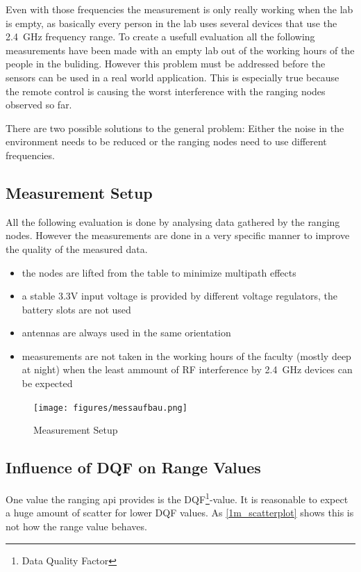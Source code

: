 Even with those frequencies the measurement is only really working when the lab is empty, as basically every person in the lab uses several devices that use the \SI{2.4}{GHz} frequency range.
To create a usefull evaluation all the following measurements have been made with an empty lab out of the working hours of the people in the buliding.
However this problem must be addressed before the sensors can be used in a real world application.
This is especially true because the remote control is causing the worst interference with the ranging nodes observed so far.

There are two possible solutions to the general problem: Either the noise in the environment needs to be reduced or the ranging nodes need to use different frequencies.


\subsection{Measurement Setup}

All the following evaluation is done by analysing data gathered by the ranging nodes.
However the measurements are done in a very specific manner to improve the quality of the measured data.
\begin{itemize}
	\item the nodes are lifted from the table to minimize multipath effects
	\item a stable 3.3V input voltage is provided by different voltage regulators, the battery slots are not used
	\item antennas are always used in the same orientation
	\item measurements are not taken in the working hours of the faculty (mostly deep at night) when the least ammount of RF interference by \SI{2.4}{GHz} devices can be expected
\end{itemize}

\begin{figure}[H]
	\centering
	\texttt{[image: figures/messaufbau.png]}
	\caption{Measurement Setup}
	\label{aufbau}
\end{figure}


\subsection{Influence of DQF on Range Values}
One value the ranging api provides is the DQF\footnote{Data Quality Factor}-value.
It is reasonable to expect a huge amount of scatter for lower DQF values.
As \autoref{1m_scatterplot} shows this is not how the range value behaves.

